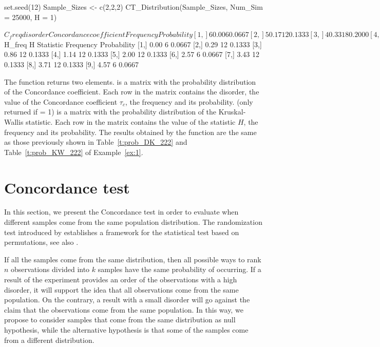 \begin{example}
set.seed(12)
Sample_Sizes <- c(2,2,2)
CT_Distribution(Sample_Sizes, Num_Sim = 25000, H = 1)

$C_freq
     disorder  Concordance coefficient Frequency Probability
[1,]        6                     0.00         6      0.0667
[2,]        5                     0.17        12      0.1333
[3,]        4                     0.33        18      0.2000
[4,]        3                     0.50        18      0.2000
[5,]        2                     0.67        18      0.2000
[6,]        1                     0.83        12      0.1333
[7,]        0                     1.00         6      0.0667

$H_freq
      H Statistic Frequency Probability
 [1,]        0.00         6      0.0667
 [2,]        0.29        12      0.1333
 [3,]        0.86        12      0.1333
 [4,]        1.14        12      0.1333
 [5,]        2.00        12      0.1333
 [6,]        2.57         6      0.0667
 [7,]        3.43        12      0.1333
 [8,]        3.71        12      0.1333
 [9,]        4.57         6      0.0667
\end{example}

The function  returns two elements.  is a matrix with the probability distribution of the Concordance coefficient. Each row in the matrix contains the disorder, the value of the Concordance coefficient $\tau_c$, the frequency and its probability.   (only returned if  = 1) is a matrix with the probability distribution of the Kruskal-Wallis statistic. Each row in the matrix contains the value of the statistic $H$, the frequency and its probability. The results obtained by the function  are the same as those previously shown in Table~\ref{t:prob_DK_222} and Table~\ref{t:prob_KW_222} of Example~\ref{ex:1}.

\section{Concordance test} \label{sec:ConcordanceTest}

In this section, we present the Concordance test in order to evaluate when  different samples come from the same population distribution. The randomization test introduced by \cite{Fisher1935} establishes a framework for the statistical test based on permutations, see also \cite{Box1980,Stern1990,Welch1990}.  

If all the samples come from the same distribution, then all possible ways to rank $n$ observations divided into $k$ samples have the same probability of occurring. If a result of the experiment provides an order of the observations with a high disorder, it will support the idea that all observations come from the same population. On the contrary, a result with a small disorder will go against the claim that the observations come from the same population. In this way, we propose to consider samples that come from the same distribution as null hypothesis, while the alternative hypothesis is that some of the samples come from a different distribution.

